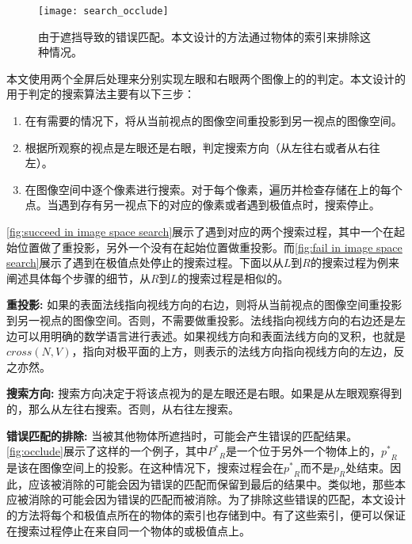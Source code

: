 {\begin{figure}[tbh]
    \centering
    \texttt{[image: search\_occlude]}
    \caption[错误匹配的排除]{\label{fig:occlude}
    由于遮挡导致的错误匹配。本文设计的方法通过物体的索引来排除这种情况。}
\end{figure}

本文使用两个全屏后处理来分别实现左眼和右眼两个图像上的\epsl{}的判定。本文设计的用于\epsl{}判定的搜索算法主要有以下三步：

\begin{enumerate}
    \item 在有需要的情况下，将\conp{}从当前视点的图像空间重投影到另一视点的图像空间。
    \item 根据\conp{}所观察的视点是左眼还是右眼，判定搜索方向（从左往右或者从右往左）。
    \item 在图像空间中逐个像素进行搜索。对于每个像素，遍历并检查存储在\ppll{}上的每个点。当遇到存有另一视点下的对应\conp{}的像素或者遇到极值点时，搜索停止。
\end{enumerate}

\autoref{fig:succeed in image space search}展示了遇到对应\conp{}的两个搜索过程，其中一个在起始位置做了重投影，另外一个没有在起始位置做重投影。而\autoref{fig:fail in image space search}展示了遇到在极值点处停止的搜索过程。下面以从$L$到$R$的搜索过程为例来阐述具体每个步骤的细节，从$R$到$L$的搜索过程是相似的。

{\textbf{重投影:} 如果\conp{}的表面法线指向视线方向的右边，则将\conp{}从当前视点的图像空间重投影到另一视点的图像空间。否则，不需要做重投影。法线指向视线方向的右边还是左边可以用明确的数学语言进行表述。如果视线方向和表面法线方向的叉积，也就是$cross(N, V)$，指向对极平面的上方，则表示\conp{}的法线方向指向视线方向的左边，反之亦然。

\textbf{搜索方向:} 搜索方向决定于将该点视为\conp{}的是左眼还是右眼。如果\conp{}是从左眼观察得到的，那么从左往右搜索。否则，从右往左搜索。

\textbf{错误匹配的排除:} 当\ec{}被其他物体所遮挡时，可能会产生错误的匹配结果。\autoref{fig:occlude}展示了这样的一个例子，其中${P^*}_R$是一个位于另外一个物体上的\conp{}，${p^*}_R$是该\conp{}在图像空间上的投影。在这种情况下，搜索过程会在${p^*}_R$而不是$p_R$处结束。因此，应该被消除的\conp{}可能会因为错误的匹配而保留到最后的结果中。类似地，那些本应被消除的\conp{}可能会因为错误的匹配而被消除。为了排除这些错误的匹配，本文设计的方法将每个\conp{}和极值点所在的物体的索引也存储到\ppll{}中。有了这些索引，便可以保证在搜索过程停止在来自同一个物体的\conp{}或极值点上。

}}
